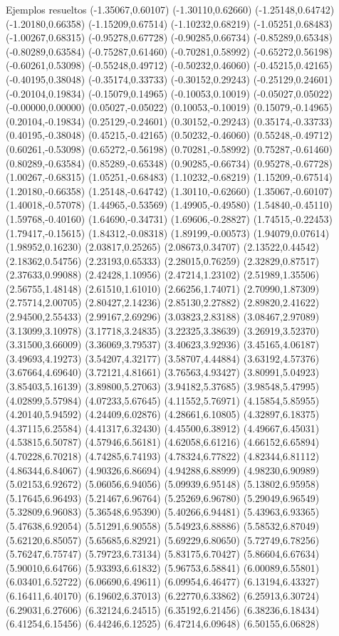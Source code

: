 \documentclass[11pt,a4paper]{article}
\begin{document}
\begin{fmex}{Ejemplos resueltos}
(-1.35067,0.60107) (-1.30110,0.62660) (-1.25148,0.64742) (-1.20180,0.66358) (-1.15209,0.67514) (-1.10232,0.68219) (-1.05251,0.68483) (-1.00267,0.68315) (-0.95278,0.67728) (-0.90285,0.66734) (-0.85289,0.65348) (-0.80289,0.63584) (-0.75287,0.61460) (-0.70281,0.58992) (-0.65272,0.56198) (-0.60261,0.53098) (-0.55248,0.49712) (-0.50232,0.46060) (-0.45215,0.42165) (-0.40195,0.38048) (-0.35174,0.33733) (-0.30152,0.29243) (-0.25129,0.24601) (-0.20104,0.19834) (-0.15079,0.14965) (-0.10053,0.10019) (-0.05027,0.05022) (-0.00000,0.00000) (0.05027,-0.05022) (0.10053,-0.10019) (0.15079,-0.14965) (0.20104,-0.19834) (0.25129,-0.24601) (0.30152,-0.29243) (0.35174,-0.33733) (0.40195,-0.38048) (0.45215,-0.42165) (0.50232,-0.46060) (0.55248,-0.49712) (0.60261,-0.53098) (0.65272,-0.56198) (0.70281,-0.58992) (0.75287,-0.61460) (0.80289,-0.63584) (0.85289,-0.65348) (0.90285,-0.66734) (0.95278,-0.67728) (1.00267,-0.68315) (1.05251,-0.68483) (1.10232,-0.68219) (1.15209,-0.67514) (1.20180,-0.66358) (1.25148,-0.64742) (1.30110,-0.62660) (1.35067,-0.60107) (1.40018,-0.57078) (1.44965,-0.53569) (1.49905,-0.49580) (1.54840,-0.45110) (1.59768,-0.40160) (1.64690,-0.34731) (1.69606,-0.28827) (1.74515,-0.22453) (1.79417,-0.15615) (1.84312,-0.08318) (1.89199,-0.00573) (1.94079,0.07614) (1.98952,0.16230) (2.03817,0.25265) (2.08673,0.34707) (2.13522,0.44542) (2.18362,0.54756) (2.23193,0.65333) (2.28015,0.76259) (2.32829,0.87517) (2.37633,0.99088) (2.42428,1.10956) (2.47214,1.23102) (2.51989,1.35506) (2.56755,1.48148) (2.61510,1.61010) (2.66256,1.74071) (2.70990,1.87309) (2.75714,2.00705) (2.80427,2.14236) (2.85130,2.27882) (2.89820,2.41622) (2.94500,2.55433) (2.99167,2.69296) (3.03823,2.83188) (3.08467,2.97089) (3.13099,3.10978) (3.17718,3.24835) (3.22325,3.38639) (3.26919,3.52370) (3.31500,3.66009) (3.36069,3.79537) (3.40623,3.92936) (3.45165,4.06187) (3.49693,4.19273) (3.54207,4.32177) (3.58707,4.44884) (3.63192,4.57376) (3.67664,4.69640) (3.72121,4.81661) (3.76563,4.93427) (3.80991,5.04923) (3.85403,5.16139) (3.89800,5.27063) (3.94182,5.37685) (3.98548,5.47995) (4.02899,5.57984) (4.07233,5.67645) (4.11552,5.76971) (4.15854,5.85955) (4.20140,5.94592) (4.24409,6.02876) (4.28661,6.10805) (4.32897,6.18375) (4.37115,6.25584) (4.41317,6.32430) (4.45500,6.38912) (4.49667,6.45031) (4.53815,6.50787) (4.57946,6.56181) (4.62058,6.61216) (4.66152,6.65894) (4.70228,6.70218) (4.74285,6.74193) (4.78324,6.77822) (4.82344,6.81112) (4.86344,6.84067) (4.90326,6.86694) (4.94288,6.88999) (4.98230,6.90989) (5.02153,6.92672) (5.06056,6.94056) (5.09939,6.95148) (5.13802,6.95958) (5.17645,6.96493) (5.21467,6.96764) (5.25269,6.96780) (5.29049,6.96549) (5.32809,6.96083) (5.36548,6.95390) (5.40266,6.94481) (5.43963,6.93365) (5.47638,6.92054) (5.51291,6.90558) (5.54923,6.88886) (5.58532,6.87049) (5.62120,6.85057) (5.65685,6.82921) (5.69229,6.80650) (5.72749,6.78256) (5.76247,6.75747) (5.79723,6.73134) (5.83175,6.70427) (5.86604,6.67634) (5.90010,6.64766) (5.93393,6.61832) (5.96753,6.58841) (6.00089,6.55801) (6.03401,6.52722) (6.06690,6.49611) (6.09954,6.46477) (6.13194,6.43327) (6.16411,6.40170) (6.19602,6.37013) (6.22770,6.33862) (6.25913,6.30724) (6.29031,6.27606) (6.32124,6.24515) (6.35192,6.21456) (6.38236,6.18434) (6.41254,6.15456) (6.44246,6.12525) (6.47214,6.09648) (6.50155,6.06828) 
\end{fmex}
\end{document}
